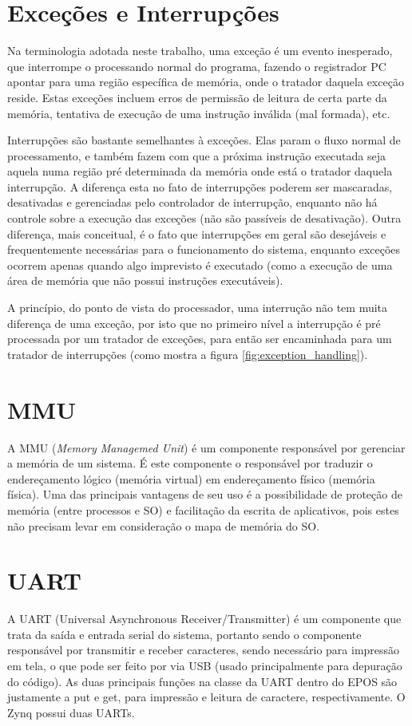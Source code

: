 \section{Exceções e Interrupções}
Na terminologia adotada neste trabalho, uma exceção é um evento inesperado, que interrompe o processando normal do programa, fazendo o registrador PC apontar para uma região específica de memória, onde o tratador daquela exceção reside. Estas exceções incluem erros de permissão de leitura de certa parte da memória, tentativa de execução de uma instrução inválida (mal formada), etc.

Interrupções são bastante semelhantes à exceções. Elas param o fluxo normal de processamento, e também fazem com que a próxima instrução executada seja aquela numa região pré determinada da memória onde está o tratador daquela interrupção. A diferença esta no fato de interrupções poderem ser mascaradas, desativadas e gerenciadas pelo controlador de interrupção, enquanto não há controle sobre a execução das exceções (não são passíveis de desativação). Outra diferença, mais conceitual, é o fato que interrupções em geral são desejáveis e frequentemente necessárias para o funcionamento do sistema, enquanto exceções ocorrem apenas quando algo imprevisto é executado (como a execução de uma área de memória que não possui instruções executáveis).

A princípio, do ponto de vista do processador, uma interrução não tem muita diferença de uma exceção, por isto que no primeiro nível a interrupção é pré processada por um tratador de exceções, para então ser encaminhada para um tratador de interrupções (como mostra a figura \ref{fig:exception_handling}).


\section{MMU} %
A MMU (\emph{Memory Managemed Unit}) é um componente responsável por gerenciar a memória de um sistema. É este componente o responsável por traduzir o endereçamento lógico (memória virtual) em endereçamento físico (memória física). Uma das principais vantagens de seu uso é a possibilidade de proteção de memória (entre processos e SO) e facilitação da escrita de aplicativos, pois estes não precisam levar em consideração o mapa de memória do SO.

\section{UART}
A UART (Universal Asynchronous Receiver/Transmitter) é um componente que trata da saída e entrada serial do sistema, portanto sendo o componente responsável por transmitir e receber caracteres, sendo necessário para impressão em tela, o que pode ser feito por via USB (usado principalmente para depuração do código). As duas principais funções na classe da UART dentro do EPOS são justamente a put e get, para impressão e leitura de caractere, respectivamente. O Zynq possui duas UARTs.


